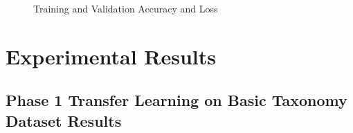 \documentclass[onecolumn, journal, english, 12pt, a4paper]{IEEEtran} %
\theoremstyle{definition}
\begin{document}
\begin{figure}[!t]
    \centering
    \hfill
    \caption{Training and Validation Accuracy and Loss}
    \label{fig:ModelosDelitosValidadosAccxEpoch}
\end{figure}


\section{Experimental Results}\label{chap:resultados}

\subsection{Phase 1 Transfer Learning on Basic Taxonomy Dataset Results}
\label{sec:phase-1-dataset-results-tl}
\end{document}
